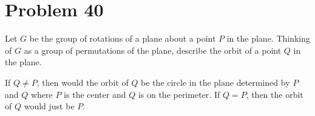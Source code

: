 \documentclass{article}
\begin{document}
\section*{Problem 40}

Let $G$ be the group of rotations of a plane about a point $P$ in the plane.
Thinking of $G$ as a group of permutations of the plane, describe the orbit
of a point $Q$ in the plane.

If $Q\neq P$, then would the orbit of $Q$ be the circle in the plane determined
by $P$ and $Q$ where $P$ is the center and $Q$ is on the perimeter.
If $Q=P$, then the orbit of $Q$ would just be $P$.
\end{document}

